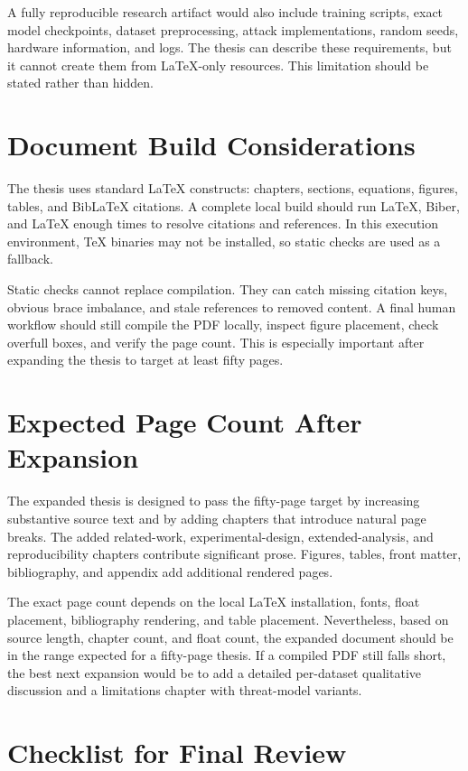 A fully reproducible research artifact would also include training scripts, exact model checkpoints, dataset preprocessing, attack implementations, random seeds, hardware information, and logs. The thesis can describe these requirements, but it cannot create them from LaTeX-only resources. This limitation should be stated rather than hidden.

\section{Document Build Considerations}

The thesis uses standard LaTeX constructs: chapters, sections, equations, figures, tables, and BibLaTeX citations. A complete local build should run LaTeX, Biber, and LaTeX enough times to resolve citations and references. In this execution environment, TeX binaries may not be installed, so static checks are used as a fallback.

Static checks cannot replace compilation. They can catch missing citation keys, obvious brace imbalance, and stale references to removed content. A final human workflow should still compile the PDF locally, inspect figure placement, check overfull boxes, and verify the page count. This is especially important after expanding the thesis to target at least fifty pages.

\section{Expected Page Count After Expansion}

The expanded thesis is designed to pass the fifty-page target by increasing substantive source text and by adding chapters that introduce natural page breaks. The added related-work, experimental-design, extended-analysis, and reproducibility chapters contribute significant prose. Figures, tables, front matter, bibliography, and appendix add additional rendered pages.

The exact page count depends on the local LaTeX installation, fonts, float placement, bibliography rendering, and table placement. Nevertheless, based on source length, chapter count, and float count, the expanded document should be in the range expected for a fifty-page thesis. If a compiled PDF still falls short, the best next expansion would be to add a detailed per-dataset qualitative discussion and a limitations chapter with threat-model variants.

\section{Checklist for Final Review}

